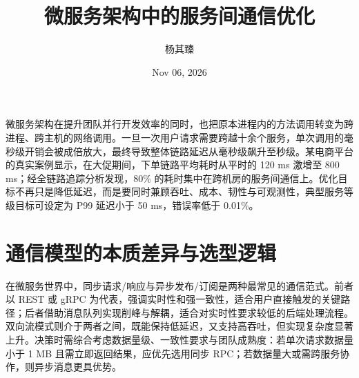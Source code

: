 \title{微服务架构中的服务间通信优化}
\author{杨其臻}
\date{Nov 06, 2026}
\maketitle
微服务架构在提升团队并行开发效率的同时，也把原本进程内的方法调用转变为跨进程、跨主机的网络调用。一旦一次用户请求需要跨越十余个服务，单次调用的毫秒级开销会被成倍放大，最终导致整体链路延迟从毫秒级飙升至秒级。某电商平台的真实案例显示，在大促期间，下单链路平均耗时从平时的 120 ms 激增至 800 ms；经全链路追踪分析发现，80\%{} 的耗时集中在跨机房的服务间通信上。优化目标不再只是降低延迟，而是要同时兼顾吞吐、成本、韧性与可观测性，典型服务等级目标可设定为 P99 延迟小于 50 ms，错误率低于 0.01\%{}。\par
\chapter{通信模型的本质差异与选型逻辑}
在微服务世界中，同步请求/响应与异步发布/订阅是两种最常见的通信范式。前者以 REST 或 gRPC 为代表，强调实时性和强一致性，适合用户直接触发的关键路径；后者借助消息队列实现削峰与解耦，适合对实时性要求较低的后端处理流程。双向流模式则介于两者之间，既能保持低延迟，又支持高吞吐，但实现复杂度显著上升。决策时需综合考虑数据量级、一致性要求与团队成熟度：若单次请求数据量小于 1 MB 且需立即返回结果，应优先选用同步 RPC；若数据量大或需跨服务协作，则异步消息更具优势。\par
